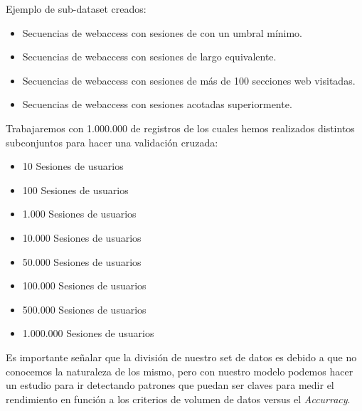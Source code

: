 { Ejemplo de sub-dataset creados:}

\begin{itemize}
	\setlength{\itemsep}{1pt}
	\setlength{\parskip}{0pt}
	\setlength{\parsep}{0pt}
	\item Secuencias de webaccess con sesiones de con un umbral mínimo.
	\item Secuencias de webaccess con sesiones de largo equivalente.
	\item Secuencias de webaccess con sesiones de más de 100 secciones web visitadas.
	\item Secuencias de webaccess con sesiones acotadas superiormente.
	
\end{itemize}


Trabajaremos con 1.000.000 de registros de los cuales hemos realizados distintos subconjuntos para hacer una validación cruzada:

\begin{itemize}
	\setlength{\itemsep}{1pt}
	\setlength{\parskip}{0pt}
	\setlength{\parsep}{0pt}
	\item 10 Sesiones de usuarios
	\item 100 Sesiones de usuarios
	\item 1.000 Sesiones de usuarios
	\item 10.000 Sesiones de usuarios
	\item 50.000 Sesiones de usuarios
	\item 100.000 Sesiones de usuarios
	\item 500.000 Sesiones de usuarios
	\item 1.000.000 Sesiones de usuarios
\end{itemize}


Es importante señalar que la división de nuestro set de datos es debido a que no conocemos la naturaleza de los mismo, pero con nuestro modelo podemos hacer un estudio para ir detectando patrones que puedan ser claves para medir el rendimiento en función a los criterios de volumen de datos versus el \emph{Accurracy}.






